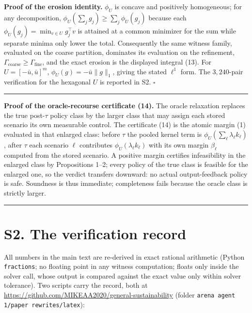 \documentclass[10pt,article]{article}
\newcommand{\rulebar}{\begin{center}\rule{0.5\linewidth}{0.5pt}\end{center}}
\begin{document}
\textbf{Proof of the erosion identity.} \(\phi_U\) is concave and
positively homogeneous; for any decomposition,
\(\phi_U(\sum_j g_j) \ge \sum_j \phi_U(g_j)\) because each
\(\phi_U(g_j) = \min_{v \in U} g_j^\top v\) is attained at a common minimizer
for the sum while separate minima only lower the total. Consequently the same
witness family, evaluated on the coarse partition, dominates its evaluation
on the refinement, \(\Gamma_{\mathrm{coarse}} \ge \Gamma_{\mathrm{fine}}\),
and the exact erosion is the displayed integral (13). For
\(U = [-\bar u, \bar u]^m\), \(\phi_U(g) = -\bar u \|g\|_1\), giving the
stated \(\ell^1\) form. The \(3{,}240\)-pair verification for the hexagonal
\(U\) is reported in S2. \hfill\(\square\)
\rulebar

\textbf{Proof of the oracle-recourse certificate (14).} The oracle relaxation
replaces the true post-\(\tau\) policy class by the larger class that may
assign each stored scenario its own measurable control. The certificate (14)
is the atomic margin (1) evaluated in that enlarged class: before \(\tau\)
the pooled kernel term is \(\phi_U(\sum_\ell \lambda_\ell k_\ell)\), after
\(\tau\) each scenario \(\ell\) contributes \(\phi_U(\lambda_\ell k_\ell)\)
with its own margin \(\beta_\ell\) computed from the stored scenario. A
positive margin certifies infeasibility in the enlarged class by
Propositions 1--2; every policy of the true class is feasible for the
enlarged one, so the verdict transfers downward: no actual output-feedback
policy is safe. Soundness is thus immediate; completeness fails because the
oracle class is strictly larger.
\rulebar

\section*{S2. The verification record}

All numbers in the main text are re-derived in exact rational arithmetic
(Python \texttt{fractions}; no floating point in any witness computation;
floats only inside the solver call, whose output is compared against the
exact value only within solver tolerance). Two scripts carry the record, both
at \url{https://github.com/MIKEAA2020/general-sustainability} (folder
\texttt{arena agent 1/paper rewrites/latex}):
\end{document}

